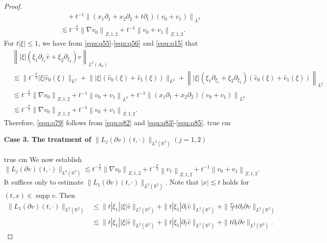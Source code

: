 \documentclass[11pt,twoside]{article}
\newcommand{\R}{\mathbb R}
\newcommand{\p}{\partial}
\newcommand{\f}{\frac}
\theoremstyle{plain}
\theoremstyle{definition}
\theoremstyle{remark}
\numberwithin{equation}{section}
\begin{document}
\begin{proof}
\begin{equation}
\begin{aligned}
&\quad+ t^{-1}\left\|(x_1\p_1+x_2\p_2+t\p_t)(v_0+v_1)\right\|_{L^2}\\
&\lesssim t^{-\frac{\mu}{2}}\left\|\nabla v_{0}\right\|_{Z, 1, 2}+ t^{-1}\left\|v_0+v_1\right\|_{Z, 1, 2}.
\end{aligned}
\end{equation}
For  $t|\xi|\leq1$,  we have from \eqref{equ:q55}-\eqref{equ:q56} and \eqref{equ:q15} that
\begin{equation}\label{equ:q85}
\begin{aligned}
&\left\||\xi|(\xi_1\p_{\xi_1}\hat{v}+\xi_2\p_{\xi_2})\hat{v}\right\|_{L^2(A_3)}\\
&\lesssim \big\|t^{-\frac{\mu}{2}}|\xi|\hat{v}_{0}(\xi)\big\|_{L^{2}}+\big\||\xi|(\hat{v}_{0}(\xi)+\hat{v}_{1}(\xi))\big\|_{L^{2}}
+\left\||\xi|(\xi_1\p_{\xi_1}+\xi_2\p_{\xi_2})(\hat{v}_{0}(\xi)+\hat{v}_{1}(\xi))\right\|_{L^{2}}\\
&\lesssim  t^{-\frac{\mu}{2}}\left\|\nabla v_{0}\right\|_{Z, 1, 2}+ t^{-1}\left\|v_0+v_1\right\|_{L^2}+ t^{-1}\left\|(x_1\p_1+x_2\p_2)(v_0+v_1)\right\|_{L^2}\\
&\lesssim t^{-\frac{\mu}{2}}\left\|\nabla v_{0}\right\|_{Z, 1, 2}+ t^{-1}\left\|v_0+v_1\right\|_{Z, 1, 2}.
\end{aligned}
\end{equation}
Therefore, \eqref{equ:q79} follows from \eqref{equ:q82} and \eqref{equ:q83}-\eqref{equ:q85}.
 true cm

{\bf Case 3.  The treatment  of $\|L_j(\p v)(t, \cdot)\|_{L^2(\R^2)}(j=1, 2)$}

 true cm
We now establish
\begin{equation}\label{equ:q86}
\|L_j(\p v)(t, \cdot)\|_{L^2(\R^2)} \lesssim t^{-\f{\mu}{2}}\left\|\nabla v_0\right\|_{Z, 1, 2}
+t^{-\f{\mu}{2}}\left\|v_1\right\|_{Z, 1,2}+t^{-1}\left\|v_0+v_1\right\|_{Z, 1, 2}.
\end{equation}
It suffices only to estimate $\|L_1(\p v)(t, \cdot)\|_{L^2(\R^2)}$.
Note that $|x|\lesssim t$ holds for $(t, x)\in \operatorname{supp}v$. Then
\begin{equation}\label{equ:q87}
\begin{aligned}
\|L_1(\p v)(t, \cdot)\|_{L^2(\R^2)}
& \leq \|t|\xi_1||\xi|\hat{v}\|_{L^2(\R^2)}+\|t|\xi_1|\p_t\hat{v}\|_{L^2(\R^2)}+\|\f{x_1}{t}t\p_t\p v\|_{L^2(\R^2)}\\
& \lesssim \|t|\xi_1||\xi|\hat{v}\|_{L^2(\R^2)}+\|t|\xi_1|\p_t\hat{v}\|_{L^2(\R^2)}+\|t\p_t\p v\|_{L^2(\R^2)}.
\end{aligned}
\end{equation}


\end{proof}
\end{document}
